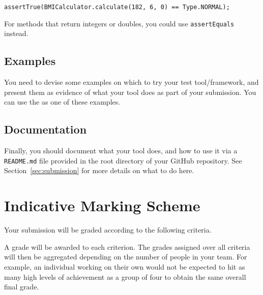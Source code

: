 \begin{center}
{\tt \scriptsize assertTrue(BMICalculator.calculate(182, 6, 0) == Type.NORMAL);}
\end{center}

For methods that return integers or doubles, you could use {\tt assertEquals} instead.

\subsection{Examples}

You need to devise some examples on which to try your test tool/framework, and
present them as evidence of what your tool does as part of your submission. You
can use the \bmicalculatorclass as one of these examples. 


\subsection{Documentation}

Finally, you should document what your tool does, and how to use it via a {\tt
README.md} file provided in the root directory of your GitHub repository. See
Section~\ref{sec:submission} for more details on what to do here.


\section{Indicative Marking Scheme}

Your submission will be graded according to the following criteria. 

A grade will be awarded to each criterion. The grades assigned over all criteria
will then be aggregated depending on the number of people in your team. For
example, an individual working on their own would not be expected to hit as many
high levels of achievement as a group of four to obtain the same overall final grade.

